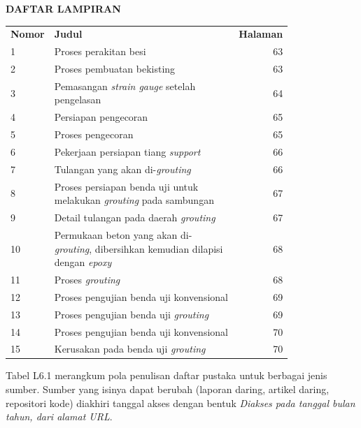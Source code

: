 \begin{tengah}
\textbf{DAFTAR LAMPIRAN}
\end{tengah}
\begin{tanpagaris}
\begin{longtable}{@{}p{0.13\linewidth}p{0.67\linewidth}r@{}}
\textbf{Nomor} & \textbf{Judul} & \textbf{Halaman} \\
1 & Proses perakitan besi & 63 \\
2 & Proses pembuatan bekisting & 63 \\
3 & Pemasangan \textit{strain gauge} setelah pengelasan & 64 \\
4 & Persiapan pengecoran & 65 \\
5 & Proses pengecoran & 65 \\
6 & Pekerjaan persiapan tiang \textit{support} & 66 \\
7 & Tulangan yang akan di-\textit{grouting} & 66 \\
8 & Proses persiapan benda uji untuk melakukan \textit{grouting} pada sambungan & 67 \\
9 & Detail tulangan pada daerah \textit{grouting} & 67 \\
10 & Permukaan beton yang akan di-\textit{grouting}, dibersihkan kemudian dilapisi dengan \textit{epoxy} & 68 \\
11 & Proses \textit{grouting} & 68 \\
12 & Proses pengujian benda uji konvensional & 69 \\
13 & Proses pengujian benda uji \textit{grouting} & 69 \\
14 & Proses pengujian benda uji konvensional & 70 \\
15 & Kerusakan pada benda uji \textit{grouting} & 70 \\
\end{longtable}
\end{tanpagaris}

Tabel L6.1 merangkum pola penulisan daftar pustaka untuk berbagai jenis sumber. Sumber yang isinya dapat berubah (laporan daring, artikel daring, repositori kode) diakhiri tanggal akses dengan bentuk \textit{Diakses pada tanggal bulan tahun, dari alamat URL}.

